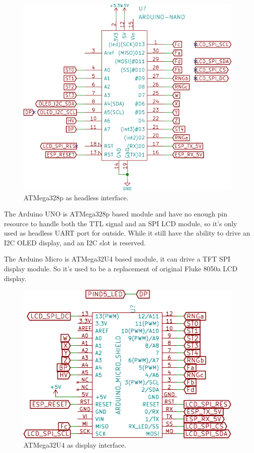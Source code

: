 \documentclass[a4paper,10pt]{article}
\begin{document}
\begin{figure}[h!t] \centering
    \includegraphics{figures/sch-smartshow-atmega328p.pdf}
    \caption{ATMega328p as headless interface.} \label{fig:smartshow-atmega328p}
\end{figure}

The Arduino UNO is ATMega328p based module and have no enough pin resource to handle both the TTL signal
and an SPI LCD module, so it's only used as headless UART port for outside. While it still have the ability
to drive an I2C OLED display, and an I2C slot is reserved.


The Arduino Micro is ATMega32U4 based module, it can drive a TFT SPI display module.
So it's used to be a replacement of original Fluke 8050a LCD display.

\begin{figure}[h!t] \centering
    \includegraphics{figures/sch-smartshow-atmega32u4.pdf}
    \caption{ATMega32U4 as display interface.} \label{fig:smartshow-atmega32u4}
\end{figure}
\end{document}
